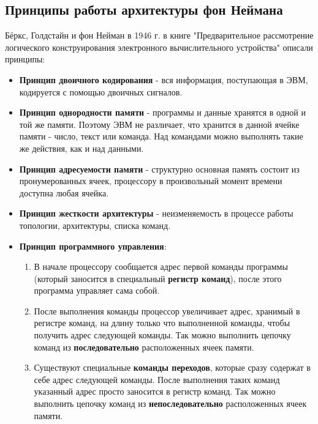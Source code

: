 \subsection{Принципы работы архитектуры фон Неймана}
Бёркс, Голдстайн и фон Нейман в 1946 г. в книге "Предварительное рассмотрение логического конструирования электронного вычислительного устройства"  описали принципы:
\begin{itemize}
  \item \textbf{Принцип двоичного кодирования} - вся информация, поступающая в ЭВМ, кодируется с помощью двоичных сигналов.
  \item \textbf{Принцип однородности памяти} - программы и данные хранятся в одной и той же памяти. Поэтому ЭВМ не различает, что хранится в данной ячейке памяти - число, текст или команда. Над командами можно выполнять такие же действия, как и над данными.
  \item \textbf{Принцип адресуемости памяти} - структурно основная память состоит из пронумерованных ячеек, процессору в произвольный момент времени доступна любая ячейка.
  \item \textbf{Принцип жесткости архитектуры} - неизменяемость в процессе работы топологии, архитектуры, списка команд.
  \newpage
  \item \textbf{Принцип программного управления}:
  \begin{enumerate}
    \item В начале процессору сообщается адрес первой команды программы (который заносится в специальный \textbf{регистр команд}), после этого программа управляет сама собой.
    \item После выполнения команды процессор увеличивает адрес, хранимый в регистре команд, на длину только что выполненной команды, чтобы получить адрес следующей команды. Так можно выполнить цепочку команд из \textbf{последовательно} расположенных ячеек памяти.
    \item Существуют специальные \textbf{команды переходов}, которые сразу содержат в себе адрес следующей команды. После выполнения таких команд указанный адрес просто заносится в регистр команд. Так можно выполнить цепочку команд из \textbf{непоследовательно} расположенных ячеек памяти.
  \end{enumerate}
\end{itemize}
